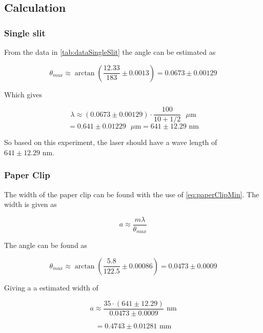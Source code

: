 \documentclass{emulateapj}
\begin{document}
\subsection{Calculation}
\subsubsection{Single slit}


From the data in \ref{tab:dataSingleSlit} the angle can be estimated as

\begin{equation}
\theta_{max} \approx \arctan\left( \frac{12.33}{183} \pm 0.0013 \right) = 0.0673 \pm 0.00129
\end{equation}

Which gives 

\begin{equation}
\lambda \approx (0.0673 \pm 0.00129) \cdot \frac{100}{10 +1/2}\text{ }\mu \text{m} 
\end{equation}
\begin{equation}
= 0.641\pm 0.01229\text{ }\mu \text{m} = 641 \pm 12.29 \text{ nm}
\end{equation}\label{eq:waveLenghtLaser}

So based on this experiment, the laser should have a wave length of $641 \pm 12.29 \text{ nm}$.

\subsubsection{Paper Clip}

The width of the paper clip can be found with the use of \eqref{eq:paperClipMin}. The width is given as

\begin{equation}
a \approx \frac{m \lambda}{\theta_{max}}
\end{equation}

The angle can be found as 

\begin{equation}
\theta_{max} \approx \arctan\left(\frac{5.8}{122.5} \pm 0.00086\right) =0.0473 \pm 0.0009
\end{equation}

Giving a a estimated width of

\begin{equation}
a \approx \frac{35\cdot (641 \pm 12.29)}{0.0473 \pm 0.0009} \text{ nm}
\end{equation} 

\begin{equation}
= 0.4743 \pm 0.01281 \text{ mm}
\end{equation}\label{eq:widthPaperClip}
\end{document}
